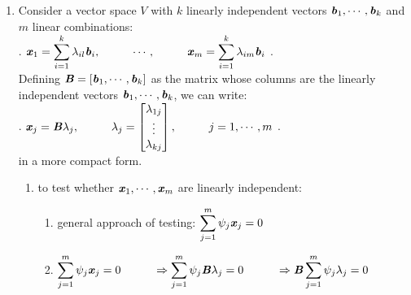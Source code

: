 \begin{enumerate}
    \item Consider a vector space $V$ with $k$ linearly independent vectors $\text{\textbf{\textit{b}}}_1, \cdots , \text{\textbf{\textit{b}}}_k$ and $m$ linear combinations:
    \hfill \cite{mfml/book/mml/Deisenroth-Faisal-Ong}
    \\
    .\hfill
    $
        \text{\textbf{\textit{x}}}_1 
        = \displaystyle\sum_{i=1}^k \lambda_{il} \text{\textbf{\textit{b}}}_i,
        \hspace{1cm}
        \cdots,
        \hspace{1cm}
        \text{\textbf{\textit{x}}}_m = \displaystyle\sum_{i=1}^k \lambda_{im} \text{\textbf{\textit{b}}}_i
    $
    \hfill.
    \hfill \cite{mfml/book/mml/Deisenroth-Faisal-Ong}
    \\
    \vspace{0.2cm}
    Defining $\text{\textbf{\textit{B}}} = [\text{\textbf{\textit{b}}}_1, \cdots , \text{\textbf{\textit{b}}}_k]$ as the matrix whose columns are the linearly independent vectors $\text{\textbf{\textit{b}}}_1, \cdots , \text{\textbf{\textit{b}}}_k$, we can write:
    \hfill \cite{mfml/book/mml/Deisenroth-Faisal-Ong}
    \\
    .\hfill
    $
        \text{\textbf{\textit{x}}}_j = \text{\textbf{\textit{B}}}\lambda_j, 
        \hspace{1cm}
        \lambda_j = \begin{bmatrix}\lambda_{1j} \\ \vdots \\ \lambda_{kj}\end{bmatrix},
        \hspace{1cm}
        j=1,\cdots,m
    $
    \hfill.
    \hfill \cite{mfml/book/mml/Deisenroth-Faisal-Ong}
    \\
    in a more compact form.
    \hfill \cite{mfml/book/mml/Deisenroth-Faisal-Ong}

    \begin{enumerate}
        \item to test whether $\text{\textbf{\textit{x}}}_1, \cdots , \text{\textbf{\textit{x}}}_m$ are linearly independent:
        \hfill \cite{mfml/book/mml/Deisenroth-Faisal-Ong}
        \begin{enumerate}
            \item general approach of testing: $\displaystyle\sum^m_{j=1} \psi_j \text{\textbf{\textit{x}}}_j = 0$
            \hfill \cite{mfml/book/mml/Deisenroth-Faisal-Ong}

            \item $
                    \displaystyle\sum^m_{j=1} \psi_j \text{\textbf{\textit{x}}}_j = 0
                    \hspace{1cm}
                    \Rightarrow \displaystyle\sum^m_{j=1} \psi_j \text{\textbf{\textit{B}}} \lambda_j = 0
                    \hspace{1cm}
                    \Rightarrow \text{\textbf{\textit{B}}} \displaystyle\sum^m_{j=1} \psi_j \lambda_j = 0
            $
            \hfill \cite{mfml/book/mml/Deisenroth-Faisal-Ong}


\end{enumerate}
\end{enumerate}
\end{enumerate}
